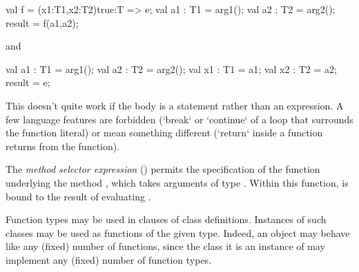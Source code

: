 \begin{xten}
{
  val f = (x1:T1,x2:T2){true}:T => e;
  val a1 : T1 = arg1();
  val a2 : T2 = arg2();
  result = f(a1,a2);
}
\end{xten}
and 
\begin{xten}
{
  val a1 : T1 = arg1();
  val a2 : T2 = arg2();
  {
     val x1 : T1 = a1;
     val x2 : T2 = a2;
     result = e;
  }  
}
\end{xten}
\noindent
This doesn't quite work if the body is a statement rather than an expression.
A few language features are forbidden (\xcd`break` or \xcd`continue` of a loop
that surrounds the function literal) or mean something different (\xcd`return`
inside a function returns from the function). 





The \emph{method selector expression}  ()
permits the specification of the function underlying
the method , which takes arguments of type .
Within this function,  is bound to the result of evaluating .

Function types may be used in  clauses of class
definitions. Instances of such classes may be used as functions of the
given type.  Indeed, an object may behave like any (fixed) number of
functions, since the class it is an instance of may implement any
(fixed) number of function types.

%


